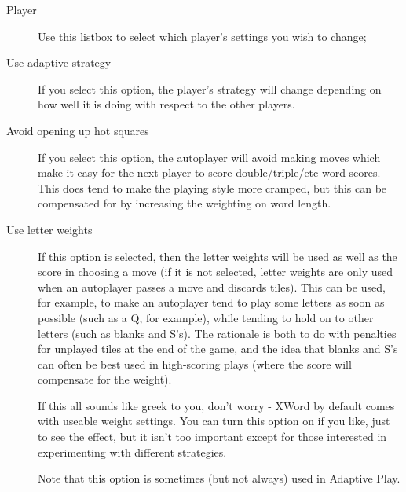 \begin{description}
\item [Player] Use this listbox to select which player's settings you
wish to change;
\item [Use adaptive strategy] If you select this option, the player's
strategy will change depending on how well it is doing with respect to
the other players. 
\item [Avoid opening up hot squares] If you select this option, the
autoplayer will avoid making moves which make it easy for the next 
player to score double/triple/etc word scores. This does tend to make
the playing style more cramped, but this can be compensated for by
increasing the weighting on word length.
\item [Use letter weights] If this option is selected, then the
letter weights will be used as well as the score in choosing a move
(if it is not selected, letter weights are only used when an 
autoplayer passes a move and discards tiles).
This can be used, for example, to make an autoplayer tend to play
some letters as soon as possible (such as a Q, for example), while
tending to hold on to other letters (such as blanks and S's). The
rationale is both to do with penalties for unplayed tiles at the
end of the game, and the idea that blanks and S's can often be best
used in high-scoring plays (where the score will compensate for the
weight).

If this all sounds like greek to you, don't worry - XWord by
default comes with useable weight settings. You can turn this option
on if you like, just to see the effect, but it isn't too important
except for those interested in experimenting with different
strategies.

Note that this option is sometimes (but not always) used in Adaptive
Play.


\end{description}
